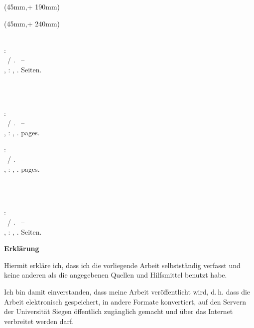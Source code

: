 \begin{textblock*}{128mm}(45mm,\seitenanfang + 190mm)
  \centering\large
  \textsf{\hsmadatum}
\end{textblock*}

\begin{textblock*}{128mm}(45mm,\seitenanfang + 240mm)
  \centering\large\sffamily
  \hsmatutor \\
  \vspace{2mm}
  \hsmabetreuer\\
  \vspace{2mm}
  \hsmazweitkorrektor
\end{textblock*}

\null\newpage
\thispagestyle{empty}

\newcommand{\hsmabibde}{\begin{small}\textbf{\hsmaautorbib}: \\ \hsmatitelde \ / \hsmaautor. \ -- \\ \hsmatypde, \hsmaort : \hsmakoerperschaftde, \hsmajahr. \pageref{lastpage} Seiten.\end{small}}

\newcommand{\hsmabiben}{\begin{small}\textbf{\hsmaautorbib}: \\ \hsmatitelen \ / \hsmaautor. \ -- \\ \hsmatypen, \hsmaort : \hsmakoerperschaften, \hsmajahr. \pageref{lastpage} pages. \end{small}}

%
{\hsmabibde \\ \vspace{0.5cm} \\ \hsmabiben}
{\hsmabiben \\ \vspace{0.5cm} \\ \hsmabibde}

\clearpage\setcounter{page}{1}
\thispagestyle{empty}
\textsf{\large\textbf{Erklärung}}

Hiermit erkläre ich, dass ich die vorliegende Arbeit selbstständig verfasst und keine anderen als die angegebenen Quellen und Hilfsmittel benutzt habe.

%
{
  \vspace{0.5cm}
  Ich bin damit einverstanden, dass meine Arbeit veröffentlicht wird, d.\,h. dass die Arbeit elektronisch gespeichert, in andere Formate konvertiert, auf den Servern der Universität Siegen öffentlich zugänglich gemacht und über das Internet verbreitet werden darf.
}{}%

